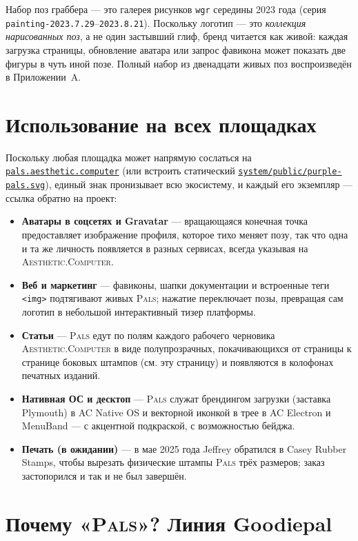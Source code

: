 \documentclass[10pt,letterpaper,twocolumn]{article}
\newcommand{\ac}{\textsc{Aesthetic}{\color{acpink}.}\textsc{Computer}}
\newcommand{\pals}{\textsc{Pals}}
\newcommand{\repofile}[1]{\href{https://github.com/whistlegraph/aesthetic-computer/blob/main/#1}{\texttt{#1}}}
\begin{document}
Набор поз граббера --- это галерея рисунков \texttt{wgr} середины 2023
года (серия \texttt{painting-2023.7.29}--\texttt{2023.8.21}). Поскольку
логотип --- это \emph{коллекция нарисованных поз}, а не один застывший
глиф, бренд читается как живой: каждая загрузка страницы, обновление
аватара или запрос фавикона может показать две фигуры в чуть иной позе.
Полный набор из двенадцати живых поз воспроизведён в Приложении~A.

\section{Использование на всех площадках}

Поскольку любая площадка может напрямую сослаться на
\href{https://pals.aesthetic.computer}{\texttt{pals.aesthetic.computer}}
(или встроить статический
\repofile{system/public/purple-pals.svg}), единый знак пронизывает всю
экосистему, и каждый его экземпляр --- ссылка обратно на проект:

\begin{itemize}
  \item \textbf{Аватары в соцсетях и Gravatar} --- вращающаяся конечная
        точка предоставляет изображение профиля, которое тихо меняет позу,
        так что одна и та же личность появляется в разных сервисах, всегда
        указывая на \ac{}.
  \item \textbf{Веб и маркетинг} --- фавиконы, шапки документации и
        встроенные теги \texttt{<img>} подтягивают живых \pals{}; нажатие
        переключает позы, превращая сам логотип в небольшой интерактивный
        тизер платформы.
  \item \textbf{Статьи} --- \pals{} едут по полям каждого рабочего
        черновика \ac{} в виде полупрозрачных, покачивающихся от страницы
        к странице боковых штампов (см. эту страницу) и появляются в
        колофонах печатных изданий.
  \item \textbf{Нативная ОС и десктоп} --- \pals{} служат брендингом
        загрузки (заставка Plymouth) в AC Native OS и векторной иконкой в
        трее в AC Electron и MenuBand --- с акцентной подкраской, с
        возможностью бейджа.
  \item \textbf{Печать (в ожидании)} --- в мае 2025 года Jeffrey
        обратился в Casey Rubber Stamps, чтобы вырезать физические штампы
        \pals{} трёх размеров; заказ застопорился и так и не был завершён.
\end{itemize}

\section{Почему «\pals{}»? Линия Goodiepal}
\end{document}
